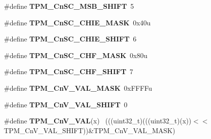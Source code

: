 \begin{DoxyCompactItemize}
\item 
\hypertarget{group___t_p_m___register___masks_gaaac3c867927ac54cedc020da041c890d}{}\#define {\bfseries T\+P\+M\+\_\+\+Cn\+S\+C\+\_\+\+M\+S\+B\+\_\+\+S\+H\+I\+F\+T}~5\label{group___t_p_m___register___masks_gaaac3c867927ac54cedc020da041c890d}

\item 
\hypertarget{group___t_p_m___register___masks_ga10d745a2f031a572b8d871ac2d6199a8}{}\#define {\bfseries T\+P\+M\+\_\+\+Cn\+S\+C\+\_\+\+C\+H\+I\+E\+\_\+\+M\+A\+S\+K}~0x40u\label{group___t_p_m___register___masks_ga10d745a2f031a572b8d871ac2d6199a8}

\item 
\hypertarget{group___t_p_m___register___masks_ga621c521a5a2376b0685156af85a93b56}{}\#define {\bfseries T\+P\+M\+\_\+\+Cn\+S\+C\+\_\+\+C\+H\+I\+E\+\_\+\+S\+H\+I\+F\+T}~6\label{group___t_p_m___register___masks_ga621c521a5a2376b0685156af85a93b56}

\item 
\hypertarget{group___t_p_m___register___masks_gac8ec8543edea61f3ebe7c98f09addd6c}{}\#define {\bfseries T\+P\+M\+\_\+\+Cn\+S\+C\+\_\+\+C\+H\+F\+\_\+\+M\+A\+S\+K}~0x80u\label{group___t_p_m___register___masks_gac8ec8543edea61f3ebe7c98f09addd6c}

\item 
\hypertarget{group___t_p_m___register___masks_ga070c2d7e35f829f8f2025682c04193d8}{}\#define {\bfseries T\+P\+M\+\_\+\+Cn\+S\+C\+\_\+\+C\+H\+F\+\_\+\+S\+H\+I\+F\+T}~7\label{group___t_p_m___register___masks_ga070c2d7e35f829f8f2025682c04193d8}

\item 
\hypertarget{group___t_p_m___register___masks_gab65cebe025551107c0b6dd05e5795ae5}{}\#define {\bfseries T\+P\+M\+\_\+\+Cn\+V\+\_\+\+V\+A\+L\+\_\+\+M\+A\+S\+K}~0x\+F\+F\+F\+Fu\label{group___t_p_m___register___masks_gab65cebe025551107c0b6dd05e5795ae5}

\item 
\hypertarget{group___t_p_m___register___masks_ga89562c16ce3c849bd51b1ba1e124b307}{}\#define {\bfseries T\+P\+M\+\_\+\+Cn\+V\+\_\+\+V\+A\+L\+\_\+\+S\+H\+I\+F\+T}~0\label{group___t_p_m___register___masks_ga89562c16ce3c849bd51b1ba1e124b307}

\item 
\hypertarget{group___t_p_m___register___masks_ga86c8881ce8afb9dd086de5330efa5222}{}\#define {\bfseries T\+P\+M\+\_\+\+Cn\+V\+\_\+\+V\+A\+L}(x)                                                  ~(((uint32\+\_\+t)(((uint32\+\_\+t)(x))$<$$<$T\+P\+M\+\_\+\+Cn\+V\+\_\+\+V\+A\+L\+\_\+\+S\+H\+I\+F\+T))\&T\+P\+M\+\_\+\+Cn\+V\+\_\+\+V\+A\+L\+\_\+\+M\+A\+S\+K)\label{group___t_p_m___register___masks_ga86c8881ce8afb9dd086de5330efa5222}


\end{DoxyCompactItemize}
